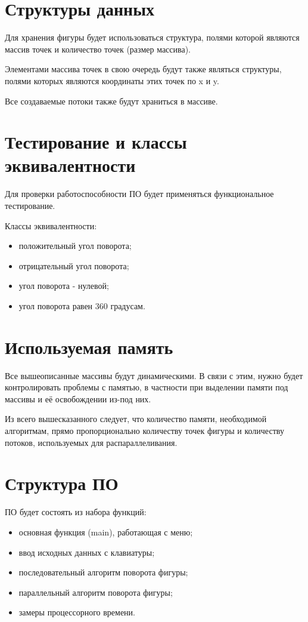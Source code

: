 \documentclass[12pt]{report}
\begin{document}
	\section{Структуры данных}
	Для хранения фигуры будет использоваться структура, полями которой являются массив точек и количество точек (размер массива).
	
	Элементами массива точек в свою очередь будут также являться структуры, полями которых являются координаты этих точек по x и y.
	
	Все создаваемые потоки также будут храниться в массиве.
	
	\section{Тестирование и классы эквивалентности}
	Для проверки работоспособности ПО будет применяться функциональное тестирование.
	
	Классы эквивалентности:
	
	\begin{itemize}
		\item положительный угол поворота;
		\item отрицательный угол поворота;
		\item угол поворота - нулевой;
		\item угол поворота равен 360 градусам.
	\end{itemize}

	\section{Используемая память}
	Все вышеописанные массивы будут динамическими. В связи с этим, нужно будет контролировать проблемы с памятью, в частности при выделении памяти под массивы и её освобождении из-под них.
	
	Из всего вышесказанного следует, что количество памяти, необходимой алгоритмам, прямо пропорционально количеству точек фигуры и количеству потоков, используемых для распараллеливания.
	
	\section{Структура ПО}
	ПО будет состоять из набора функций:
	
	\begin{itemize}
		\item основная функция (main), работающая с меню;
		\item ввод исходных данных с клавиатуры;
		\item последовательный алгоритм поворота фигуры;
		\item параллельный алгоритм поворота фигуры;
		\item замеры процессорного времени.
	\end{itemize}
	
\end{document}
